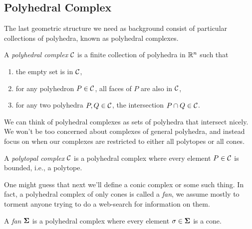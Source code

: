 \documentclass[12pt,oneside]{../../sfsuthesis}
\begin{document}
\subsection{Polyhedral Complex}
The last geometric structure we need as background consist of particular collections of polyhedra, known as polyhedral complexes.
\begin{definition}\th\label{def:polyhedralComplex}
    A \emph{polyhedral complex} \( \mathcal{C} \) is a finite collection of polyhedra in \( \mathbb{R}^n \) such that
    \begin{enumerate}
        \item the empty set is in \( \mathcal{C} \),
        \item for any polyhedron \( P \in \mathcal{C} \), all faces of \( P \) are also in \( \mathcal{C} \),
        \item for any two polyhedra \( P, Q \in \mathcal{C} \), the intersection \( P \cap Q \in \mathcal{C} \).
    \end{enumerate}
\end{definition}
We can think of polyhedral complexes as sets of polyhedra that intersect nicely.
We won't be too concerned about complexes of general polyhedra, and instead focus on when our complexes are restricted to either all polytopes or all cones.
\begin{definition}\th\label{def:polytopalComplex}
    A \emph{polytopal complex} \( \mathcal{C} \) is a polyhedral complex where every element \( P \in \mathcal{C} \) is bounded, i.e., a polytope.
\end{definition}
One might guess that next we'll define a conic complex or some such thing.
In fact, a polyhedral complex of only cones is called a \emph{fan}, we assume mostly to torment anyone trying to do a web-search for information on them.
\begin{definition}[Fan]\th\label{def:fan}
    A \emph{fan} \( \bm{\Sigma} \) is a polyhedral complex where every element \( \sigma \in \bm{\Sigma} \) is a cone.
\end{definition}
\end{document}
